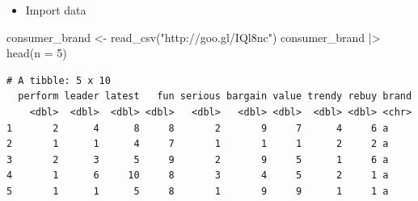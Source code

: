 \documentclass[
  ignorenonframetext,
]{beamer}
\newenvironment{Shaded}{\begin{snugshade}}{\end{snugshade}}
\newcommand{\AttributeTok}[1]{\textcolor[rgb]{0.40,0.45,0.13}{#1}}
\newcommand{\DecValTok}[1]{\textcolor[rgb]{0.68,0.00,0.00}{#1}}
\newcommand{\FunctionTok}[1]{\textcolor[rgb]{0.28,0.35,0.67}{#1}}
\newcommand{\NormalTok}[1]{\textcolor[rgb]{0.00,0.23,0.31}{#1}}
\newcommand{\OtherTok}[1]{\textcolor[rgb]{0.00,0.23,0.31}{#1}}
\newcommand{\SpecialCharTok}[1]{\textcolor[rgb]{0.37,0.37,0.37}{#1}}
\newcommand{\StringTok}[1]{\textcolor[rgb]{0.13,0.47,0.30}{#1}}
\providecommand{\tightlist}{%
  \setlength{\itemsep}{0pt}\setlength{\parskip}{0pt}}\usepackage{longtable,booktabs,array}
\begin{document}
\begin{frame}[fragile]{}
\label{section-3}
\begin{itemize}
\tightlist
\item
  Import data
\end{itemize}

\tiny

\begin{Shaded}
\begin{Highlighting}[]
\NormalTok{consumer\_brand }\OtherTok{\textless{}{-}} \FunctionTok{read\_csv}\NormalTok{(}\StringTok{"http://goo.gl/IQl8nc"}\NormalTok{)}
\NormalTok{consumer\_brand }\SpecialCharTok{|\textgreater{}} \FunctionTok{head}\NormalTok{(}\AttributeTok{n =} \DecValTok{5}\NormalTok{)}
\end{Highlighting}
\end{Shaded}

\begin{verbatim}
# A tibble: 5 x 10
  perform leader latest   fun serious bargain value trendy rebuy brand
    <dbl>  <dbl>  <dbl> <dbl>   <dbl>   <dbl> <dbl>  <dbl> <dbl> <chr>
1       2      4      8     8       2       9     7      4     6 a    
2       1      1      4     7       1       1     1      2     2 a    
3       2      3      5     9       2       9     5      1     6 a    
4       1      6     10     8       3       4     5      2     1 a    
5       1      1      5     8       1       9     9      1     1 a    
\end{verbatim}
\end{frame}
\end{document}
